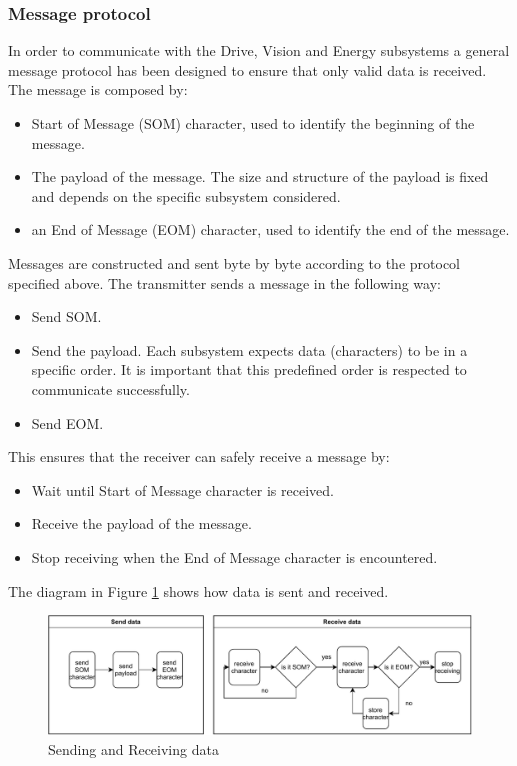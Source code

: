 \documentclass[10pt,twoside]{article}
\begin{document}
\subsubsection{Message protocol} 
In order to communicate with the Drive, Vision and Energy subsystems a general message protocol has been designed to ensure that only valid data is received. The message is composed by:
\begin{itemize}[noitemsep]
    \item Start of Message (SOM) character, used to identify the beginning of the message.
    \item The payload of the message. The size and structure of the payload is fixed and depends on the specific subsystem considered.
    \item an End of Message (EOM) character, used to identify the end of the message.
\end{itemize}

Messages are constructed and sent byte by byte according to the protocol specified above.
The transmitter sends a message in the following way:
\begin{itemize}[noitemsep]
    \item Send SOM.
    \item Send the payload. Each subsystem expects data (characters) to be in a specific order. It is important that this predefined order is respected to communicate successfully. 
    \item Send EOM.
\end{itemize}
This ensures that the receiver can safely receive a message by:
\begin{itemize}[noitemsep]
    \item Wait until Start of Message character is received.
    \item Receive the payload of the message.
    \item Stop receiving when the End of Message character is encountered.
\end{itemize}

The diagram in Figure \ref{fig:SendAndReceive} shows how data is sent and received.

\begin{figure}[hbt]
    \centering
    \includegraphics[width = \textwidth]{Send_and_receive.pdf}
    \caption{Sending and Receiving data}
    \label{fig:SendAndReceive}
\end{figure}
\end{document}
